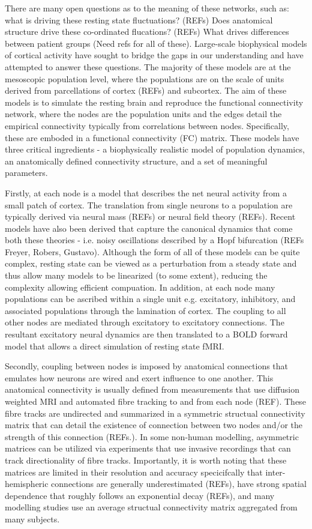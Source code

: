 \documentclass[oneside]{zHenriquesLab-StyleBioRxiv}
\begin{document}
There are many open questions as to the meaning of these networks, such as: what is driving these resting state fluctuations? (REFs) Does anatomical structure drive these co-ordinated flucations? (REFs) What drives differences between patient groups (Need refs for all of these). Large-scale biophysical models of cortical activity have sought to bridge the gaps in our understanding and have attempted to answer these questions. The majority of these models are at the mesoscopic population level, where the populations are on the scale of units derived from parcellations of cortex (REFs) and subcortex. The aim of these models is to simulate the resting brain and reproduce the functional connectivity network, where the nodes are the population units and the edges detail the empirical connectivity typically from correlations between nodes. Specifically, these are emboded in a functional connectivity (FC) matrix. These models have three critical ingredients - a biophysically realistic model of population dynamics, an anatomically defined connectivity structure, and a set of meaningful parameters. 


Firstly, at each node is a model that describes the net neural activity from a small patch of cortex. The translation from single neurons to a population are typically derived via neural mass (REFs) or neural field theory (REFs). Recent models have also been derived that capture the canonical dynamics that come both these theories - i.e. noisy oscillations described by a Hopf bifurcation (REFs Freyer, Robers, Gustavo). Although the form of all of these models can be quite complex, resting state can be viewed as a perturbation from a steady state and thus allow many models to be linearized (to some extent), reducing the complexity allowing efficient compuation. In addition, at each node many populations can be ascribed within a single unit e.g. excitatory, inhibitory, and associated populations through the lamination of cortex. The coupling to all other nodes are mediated through excitatory to excitatory connections. The resultant excitatory neural dynamics are then translated to a BOLD forward model that allows a direct simulation of resting state fMRI.


Secondly, coupling between nodes is imposed by anatomical connections that emulates how neurons are wired and exert influence to one another. This anatomical connectivity is usually defined from measurements that use diffusion weighted MRI and automated fibre tracking to and from each node (REF). These fibre tracks are undirected and summarized in a symmetric structual connectivity matrix that can detail the existence of connection between two nodes and/or the strength of this connection (REFs.). In some non-human modelling, asymmetric matrices can be utilized via experiments that use invasive recordings that can track directionality of fibre tracks. Importantly, it is worth noting that these matrices are limited in their resolution and accuracy specicifcally that inter-hemispheric connections are generally underestimated (REFs), have strong spatial dependence that roughly follows an exponential decay (REFs), and many modelling studies use an average structual connectivity matrix aggregated from many subjects. 
\end{document}
